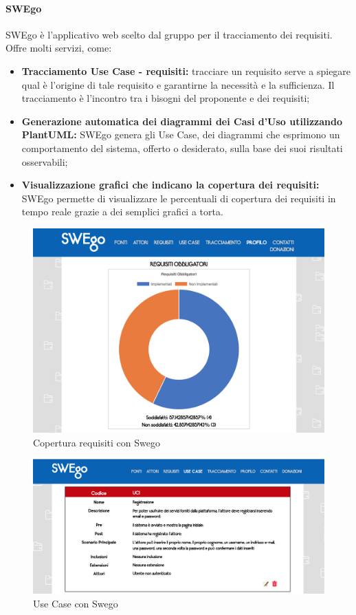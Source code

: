 		\paragraph{SWEgo}
		\label {sec:SWEgo}
		\Spazio
		SWEgo è l'applicativo web scelto dal gruppo per il tracciamento dei requisiti. Offre molti servizi, come:
		\begin{itemize}
			\item \textbf{Tracciamento Use Case - requisiti:}
			tracciare un requisito serve a spiegare qual è l'origine di tale requisito e garantirne la necessità e la sufficienza. Il tracciamento è l'incontro tra i bisogni del proponente e dei requisiti;
			\item \textbf{Generazione automatica dei diagrammi dei Casi d'Uso utilizzando PlantUML:}
			SWEgo genera gli Use Case, dei diagrammi che esprimono un comportamento del sistema, offerto o desiderato, sulla base dei suoi risultati osservabili;
			\item \textbf{Visualizzazione grafici che indicano la copertura dei requisiti: }
			SWEgo permette di visualizzare le percentuali di copertura dei requisiti in tempo reale grazie a dei semplici grafici a torta.
		\end{itemize}
		\begin{figure}[H]
		\label{figuraSwego}
		\centering 
		\includegraphics[width=1\textwidth]{images/swego1.png}
		\caption{Copertura requisiti con Swego} %
		\end{figure}
	
	\begin{figure}[H]
	\label{figuraSwego}
	\centering 
	\includegraphics[width=1\textwidth]{images/swego2.png}
	\caption{Use Case con Swego} %
	\end{figure}


